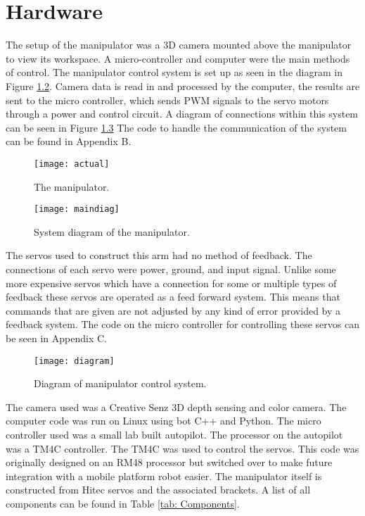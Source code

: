 \chapter{Hardware}
The setup of the manipulator was a 3D camera mounted above the manipulator to view its workspace. A micro-controller and computer were the main methods of control. The manipulator control system is set up as seen in the diagram in Figure \ref{fig:maindiagram}. Camera data is read in and processed by the computer, the results are sent to the micro controller, which sends PWM signals to the servo motors through a power and control circuit. A diagram of connections within this system can be seen in Figure \ref{fig:diagram} The code to handle the communication of the system can be found in Appendix B.

\begin{figure}[h]
\centering
\texttt{[image: actual]}
\caption{The manipulator.}
\label{fig:real}
\end{figure}

\begin{figure}[h*]
\centering
\texttt{[image: maindiag]}
\caption{System diagram of the manipulator.}
\label{fig:maindiagram}
\end{figure}

The servos used to construct this arm had no method of feedback. The connections of each servo were power, ground, and input signal. Unlike some more expensive servos which have a connection for some or multiple types of feedback these servos are operated as a feed forward system. This means that commands that are given are not adjusted by any kind of error provided by a feedback system. The code on the micro controller for controlling these servos can be seen in Appendix C.


\begin{figure}
\centering
\texttt{[image: diagram]}
\caption{Diagram of manipulator control system.}
\label{fig:diagram}
\end{figure}

The camera used was a Creative Senz 3D depth sensing and color camera. The computer code was run on Linux using bot C++ and Python. The micro controller used was a small lab built autopilot. The processor on the autopilot was a TM4C controller. The TM4C was used to control the servos. This code was originally designed on an RM48 processor but switched over to make future integration with a mobile platform robot easier. The manipulator itself is constructed from Hitec servos and the associated brackets. A list of all components can be found in Table \ref{tab: Components}.


